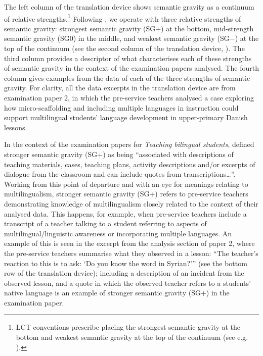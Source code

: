 \documentclass[output=paper]{langscibook}
\begin{document}
The left column of the translation device shows semantic gravity as a continuum of relative strengths.\footnote{LCT conventions prescribe placing the strongest semantic gravity at the bottom and weakest semantic gravity at the top of the continuum (see e.g. \citealt[111]{Maton2014}).} Following \citet{Kirk2017}, we operate with three relative strengths of semantic gravity: strongest semantic gravity (SG+) at the bottom, mid-strength semantic gravity (SG0) in the middle, and weakest semantic gravity (SG−) at the top of the continuum (see the second column of the translation device, ). The third column provides a descriptor of what characterises each of these strengths of semantic gravity in the context of the examination papers analysed. The fourth column gives examples from the data of each of the three strengths of semantic gravity. For clarity, all the data excerpts in the translation device are from examination paper 2, in which the pre-service teachers analysed a case exploring how micro-scaffolding and including multiple languages in instruction could support multilingual students’ language development in upper-primary Danish lessons.

In the context of the examination papers for \textit{Teaching bilingual students}, \citet[182]{Meidell_sigsgaard2021} defined stronger semantic gravity (SG+) as being “associated with descriptions of teaching materials, cases, teaching plans, activity descriptions and/or excerpts of dialogue from the classroom and can include quotes from transcriptions…”. Working from this point of departure and with an eye for meanings relating to multilingualism, stronger semantic gravity (SG+) refers to pre-service teachers demonstrating knowledge of multilingualism closely related to the context of  their analysed data. This happens, for example, when pre-service teachers include a transcript of a teacher talking to a student referring to aspects of multilingual\slash linguistic awareness or incorporating multiple languages. An example of this is seen in the excerpt from the analysis section of paper 2, where the pre-service teachers summarise what they observed in a lesson: “The teacher’s reaction to this is to ask: `Do you know the word in Syrian?'” (see the bottom row of the translation device); including a description of an incident from the observed lesson, and a quote in which the observed teacher refers to a students’ native language is an example of stronger semantic gravity (SG+) in the examination paper.
\end{document}
